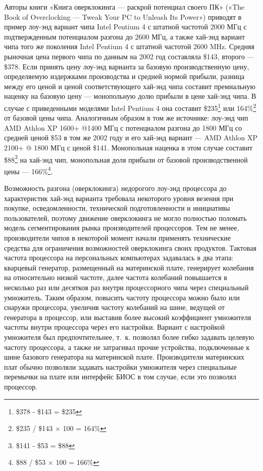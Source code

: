 \documentclass{article}
\begin{document}
Авторы книги «Книга оверклокинга — раскрой потенциал своего ПК» («The Book of Overclocking — Tweak Your PC to Unleash Its Power») \cite{theBookOfOverclocking2003} приводят в пример лоу-энд вариант чипа Intel Pentium 4 с штатной частотой 2000 МГц с подтвержденным потенциалом разгона до 2600 МГц, а также хай-энд вариант чипа того же поколения Intel Pentium 4 с штатной частотой 2600 MHz. Средняя рыночная цена первого чипа по данным на 2002 год составляла \$143, второго — \$378. Если принять цену лоу-энд варианта за базовую производственную цену, определяемую издержками производства и средней нормой прибыли, разница между его ценой и ценой соответствующего хай-энд чипа составит премиальную наценку на базовую цену — монопольную долю прибыли в цене хай-энд чипа. В случае с приведенными моделями Intel Pentium 4 она составит \$235\footnote{\$378 - \$143 = \$235} или 164\%\footnote{\$235 / \$143 × 100 = 164\%} от базовой цены чипа. Аналогичным образом в том же источнике: лоу-энд чип AMD Athlon XP 1600+ @1400 МГц с потенциалом разгона до 1800 МГц со средней ценой \$53 в том же 2002 году и его хай-энд вариант — AMD Athlon XP 2100+ @ 1800 МГц с ценой \$141. Монопольная наценка в этом случае составит \$88\footnote{\$141 - \$53 = \$88} на хай-энд чип, монопольная доля прибыли от базовой производственной цены — 166\%\footnote{\$88 / \$53 × 100 = 166\%}.

Возможность разгона (оверклокинга) недорогого лоу-энд процессора до характеристик хай-энд варианта требовала некоторого уровня везения при покупке, осведомленности, технической подготовленности и инициативы пользователей, поэтому движение оверклокинга не могло полностью поломать модель сегментирования рынка производителей процессоров. Тем не менее, производители чипов в некоторой момент начали применять технические средства для ограничения возможностей оверклокинга своих продуктов. Тактовая частота процессора на персональных компьютерах задавалась в два этапа: кварцевый генератор, размещенный на материнской плате, генерирует колебания на относительно низкой частоте, далее частота колебаний повышается в несколько раз или десятков раз внутри процессорного чипа через специальный умножитель. Таким образом, повысить частоту процессора можно было или снаружи процессора, увеличив частоту колебаний на шине, ведущей от генератора в процессор, или выставив более высокий коэффициент умножителя частоты внутри процессора через его настройки. Вариант с настройкой умножителя был предпочтительнее, т.~к. позволял более гибко задавать целевую частоту процессора, а также не затрагивал прочие устройства, подключенные к шине базового генератора на материнской плате. Производители материнских плат обычно позволяли задавать настройки умножителя через специальные перемычки на плате или интерфейс БИОС в том случае, если это позволял процессор.
\end{document}
